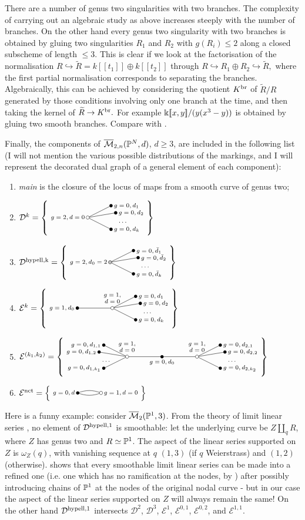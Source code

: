 \begin{rmk}
 There are a number of genus two singularities with two branches. The complexity of carrying out an algebraic study as above increases steeply with the number of branches. On the other hand every genus two singularity with two branches is obtained by gluing two singularities $R_1$ and $R_2$ with $g(R_i)\leq 2$ along a closed subscheme of length $\leq 3$.
 This is clear if we look at the factorisation of the normalisation $R\hookrightarrow \widetilde{R}=k[\![t_1]\!]\oplus k[\![t_2]\!]$ through $R\hookrightarrow R_1\oplus R_2\hookrightarrow \widetilde{R},$ where 
 the first partial normalisation corresponds to separating the branches. Algebraically, this can be achieved by considering the quotient $K^{\rm{br}}$ of $\widetilde{R}/R$ generated by those conditions involving only one branch at the time, and then taking the kernel of $\widetilde{R}\to K^{\rm{br}}.$ For example $\kk[\![x,y]\!]/(y(x^3-y))$ is obtained by gluing two smooth branches. Compare with \cite[Appendix A]{SMYtowards}.
\end{rmk}

Finally, the components of $\M{2}{n}{\PP^N}{d}$, $d\geq 3$, are included in the following list (I will not mention the various possible distributions of the markings, and I will represent the decorated dual graph of a general element of each component):
\begin{enumerate}
 \item \emph{main} is the closure of the locus of maps from a smooth curve of genus two;
 \item $\mathcal D^k=\left\{\Dk\right\}$
  \item $\mathcal D^{\rm{hypell},k}=\left\{\hypell\right\}$
 \item $\mathcal E^k=\left\{\Ek\right\}$
 \item $\mathcal E^{(k_1,k_2)}=\left\{\Ekk\right\}$
 \item $\mathcal E^{\rm{nct}}=\left\{\pacman\right\}$
\end{enumerate}
Here is a funny example: consider $\oM_2(\PP^1,3)$. From the theory of limit linear series \cite{EH}, no element of $\mathcal D^{\rm{hypell},1}$ is smoothable: let the underlying curve be $Z\coprod_q R$, where $Z$ has genus two and $R\simeq\PP^1$. The aspect of the linear series supported on $Z$ is $\omega_Z(q)$, with vanishing sequence at $q$ $(1,3)$ (if $q$ Weierstrass) and $(1,2)$ (otherwise). \cite[Theorem 2.6]{EH} shows that every smoothable limit linear series can be made into a refined one (i.e. one which has no ramification at the nodes, by \cite[Proposition 2.5]{EH}) after possibly introducing chains of $\PP^1$ at the nodes of the original nodal curve - but in our case the aspect of the linear series supported on $Z$ will always remain the same! On the other hand $\mathcal D^{\rm{hypell},1}$ intersects $\mathcal D^2$, $\mathcal D^3$, $\mathcal E^1$, $\mathcal E^{0,1}$, $\mathcal E^{0,2}$, and $\mathcal E^{1,1}$. 

